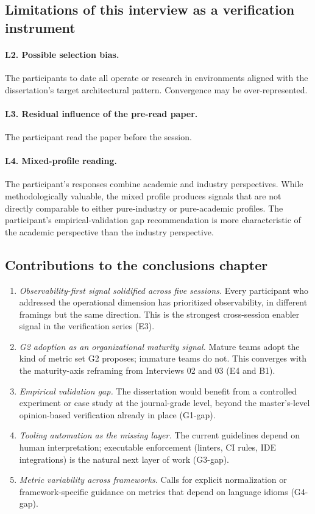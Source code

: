 \subsection*{Limitations of this interview as a verification instrument}

\paragraph*{L2. Possible selection bias.} The participants to date all operate or research in environments aligned with the dissertation's target architectural pattern. Convergence may be over-represented.

\paragraph*{L3. Residual influence of the pre-read paper.} The participant read the paper before the session.

\paragraph*{L4. Mixed-profile reading.} The participant's responses combine academic and industry perspectives. While methodologically valuable, the mixed profile produces signals that are not directly comparable to either pure-industry or pure-academic profiles. The participant's empirical-validation gap recommendation is more characteristic of the academic perspective than the industry perspective.

\subsection*{Contributions to the conclusions chapter}

\begin{enumerate}[itemsep=3pt,topsep=2pt]
  \item \emph{Observability-first signal solidified across five sessions.} Every participant who addressed the operational dimension has prioritized observability, in different framings but the same direction. This is the strongest cross-session enabler signal in the verification series (E3).
  \item \emph{G2 adoption as an organizational maturity signal.} Mature teams adopt the kind of metric set G2 proposes; immature teams do not. This converges with the maturity-axis reframing from Interviews 02 and 03 (E4 and B1).
  \item \emph{Empirical validation gap.} The dissertation would benefit from a controlled experiment or case study at the journal-grade level, beyond the master's-level opinion-based verification already in place (G1-gap).
  \item \emph{Tooling automation as the missing layer.} The current guidelines depend on human interpretation; executable enforcement (linters, CI rules, IDE integrations) is the natural next layer of work (G3-gap).
  \item \emph{Metric variability across frameworks.} Calls for explicit normalization or framework-specific guidance on metrics that depend on language idioms (G4-gap).
\end{enumerate}

